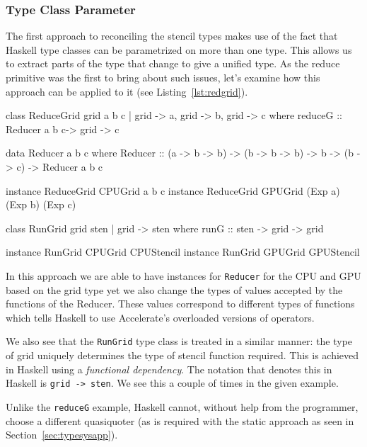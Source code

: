 \documentclass[12pt,a4paper,twoside]{scrbook}
\begin{document}
\subsubsection{Type Class Parameter}

The first approach to reconciling the stencil types makes use of the fact that
Haskell type classes can be parametrized on more than one type. This allows us
to extract parts of the type that change to give a unified type. As the reduce
primitive was the first to bring about such issues, let's examine how this
approach can be applied to it (see Listing~\ref{lst:redgrid}).

\begin{hflisting}[label={lst:redgrid}, caption={The \texttt{ReduceGrid} type
  class defined with type parameters for each variable: \texttt{a}, \texttt{b}
  and \texttt{c}.}]
class ReduceGrid grid a b c | grid -> a,
                              grid -> b,
                              grid -> c where
    reduceG :: Reducer a b c-> grid -> c

data Reducer a b c where
    Reducer ::   (a -> b -> b)
              -> (b -> b -> b)
              -> b
              -> (b -> c)
              -> Reducer a b c

instance ReduceGrid CPUGrid a b c
instance ReduceGrid GPUGrid (Exp a) (Exp b) (Exp c)

class RunGrid grid sten | grid -> sten where
    runG :: sten -> grid -> grid

instance RunGrid CPUGrid CPUStencil
instance RunGrid GPUGrid GPUStencil
\end{hflisting}

In this approach we are able to have instances for \texttt{Reducer} for the CPU
and GPU based on the grid type yet we also change the types of values accepted
by the functions of the Reducer. These values correspond to different types of
functions which tells Haskell to use Accelerate's overloaded versions of
operators.

We also see that the \texttt{RunGrid} type class is treated in a similar manner:
the type of grid uniquely determines the type of stencil function required. This
is achieved in Haskell using a \emph{functional dependency}. The notation that
denotes this in Haskell is \texttt{grid -> sten}. We see this a
couple of times in the given example.

Unlike the \texttt{reduceG} example, Haskell cannot, without help from the
programmer, choose a different quasiquoter (as is required with the static
approach as seen in Section~\ref{sec:typesysapp}).
\end{document}
